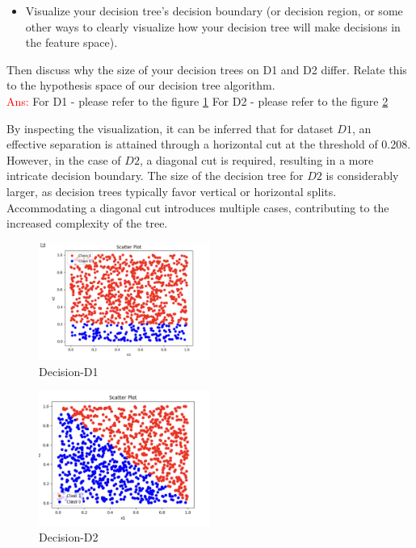\documentclass[a4paper]{article}
\theoremstyle{definition}
\newcommand{\red}[1]{\textcolor{red}{#1}}
\begin{document}
\begin{enumerate}
\begin{itemize}
  \item Visualize your decision tree's decision boundary (or decision region, or some other ways to clearly visualize how your decision tree will make decisions in the feature space).

  \end{itemize}
Then discuss why the size of your decision trees on D1 and D2 differ.  Relate this to the hypothesis space of our decision tree algorithm. \\

\red{Ans:} 
 For D1 - please refer to the figure \ref{fig:Decision_D1}
 For D2 - please refer to the figure \ref{fig:Decision_D2}

By inspecting the visualization, it can be inferred that for dataset \(D1\), an effective separation is attained through a horizontal cut at the threshold of 0.208. However, in the case of \(D2\), a diagonal cut is required, resulting in a more intricate decision boundary. The size of the decision tree for \(D2\) is considerably larger, as decision trees typically favor vertical or horizontal splits. Accommodating a diagonal cut introduces multiple cases, contributing to the increased complexity of the tree.


\begin{figure}[htbp]
  \centering
  \includegraphics[width=0.5\textwidth]{Q2.6b.png}
  \caption{Decision-D1}
  \label{fig:Decision_D1}
\end{figure}

\begin{figure}[htbp]
  \centering
  \includegraphics[width=0.5\textwidth]{Q2.6a.png}
  \caption{Decision-D2}
  \label{fig:Decision_D2}
\end{figure}







\end{enumerate}
\end{document}
